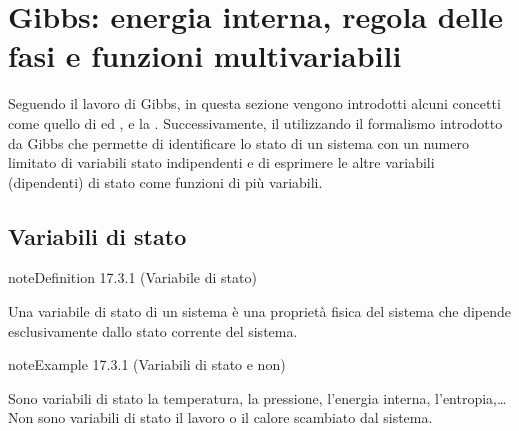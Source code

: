 \documentclass[letterpaper,10pt,italian]{jupyterBook}
\begin{document}
\section{Gibbs: energia interna, regola delle fasi e funzioni multi\sphinxhyphen{}variabili}
\label{\detokenize{ch/thermodynamics/principles-gibbs-phase-rule:gibbs-energia-interna-regola-delle-fasi-e-funzioni-multi-variabili}}\label{\detokenize{ch/thermodynamics/principles-gibbs-phase-rule:physics-hs-thermodynamics-foundation-principles-gibbs-phase-rule}}\label{\detokenize{ch/thermodynamics/principles-gibbs-phase-rule::doc}}
\sphinxAtStartPar
Seguendo il lavoro di Gibbs, in questa sezione vengono introdotti alcuni concetti come quello di {\hyperref[\detokenize{ch/thermodynamics/principles-gibbs-phase-rule:physics-hs-thermodynamics-foundation-principles-gibbs-phase-rule-state-vars}]{}} ed {\hyperref[\detokenize{ch/thermodynamics/principles-gibbs-phase-rule:physics-hs-thermodynamics-foundation-principles-gibbs-phase-rule-internal-energy}]{}}, e la {\hyperref[\detokenize{ch/thermodynamics/principles-gibbs-phase-rule:physics-hs-thermodynamics-foundation-principles-gibbs-phase-rule-gibbs-phase-rule}]{}}. Successivamente, il {\hyperref[\detokenize{ch/thermodynamics/principles-gibbs-phase-rule:physics-hs-thermodynamics-foundation-principles-gibbs-phase-rule-first}]{}} utilizzando il formalismo introdotto da Gibbs che permette di identificare lo stato di un sistema con un numero limitato di variabili stato indipendenti e di esprimere le altre variabili (dipendenti) di stato come funzioni di più variabili.


\subsection{Variabili di stato}
\label{\detokenize{ch/thermodynamics/principles-gibbs-phase-rule:variabili-di-stato}}\label{\detokenize{ch/thermodynamics/principles-gibbs-phase-rule:physics-hs-thermodynamics-foundation-principles-gibbs-phase-rule-state-vars}}\label{ch/thermodynamics/principles-gibbs-phase-rule:definition-0}
\begin{sphinxadmonition}{note}{Definition 17.3.1 (Variabile di stato)}



\sphinxAtStartPar
Una variabile di stato di un sistema è una proprietà fisica del sistema che dipende esclusivamente dallo stato corrente del sistema.
\end{sphinxadmonition}
\label{ch/thermodynamics/principles-gibbs-phase-rule:example-1}
\begin{sphinxadmonition}{note}{Example 17.3.1 (Variabili di stato e non)}



\sphinxAtStartPar
Sono variabili di stato la temperatura, la pressione, l’energia interna, l’entropia,…
Non sono variabili di stato il lavoro o il calore scambiato dal sistema. 
\end{sphinxadmonition}
\end{document}
